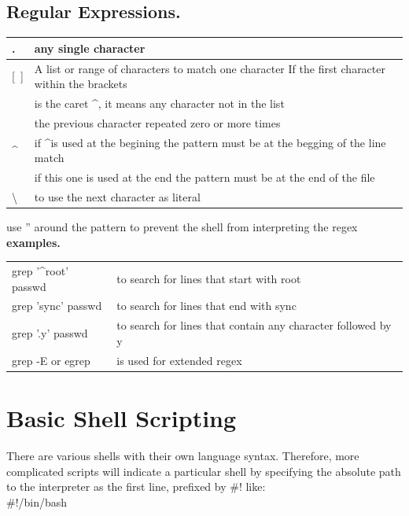 \documentclass[10pt]{article}
\begin{document}
\subsection{Regular Expressions.}
\begin{center}
	\begin{tabular}{|l|l|}
		\hline.    & any single character\\
		\hline{[\ ]}& A list or range of characters to match one character If the first character within the brackets \\
					&is the caret	\textasciicircum, it means any character not in the list\\
		\hline\textasteriskcentered &  the previous character repeated zero or more times\\
		\hline\textasciicircum & if \textasciicircum is used at the begining the pattern must be at the begging of the line match\\
		\hline\textdollar & if this one is used at the end the pattern must be at the end of the file\\
		\hline\textbackslash & to use the next character as literal\\\hline
	\end{tabular}
\end{center}
use '' around the pattern to prevent the shell from interpreting the regex\\
\textbf{examples.}\\
\begin{center}
	\begin{tabular}{l l}


		grep '\textasciicircum  root' passwd & to search for lines that start with root\\
		grep 'sync\textdollar ' passwd & to search for lines that end with sync\\
		grep '.y' passwd & to search for lines that contain any character followed by y\\
		grep -E or egrep & is used for extended regex\\

	\end{tabular}
\end{center}

\section{Basic Shell Scripting}
There are various shells with their own language syntax. Therefore, more complicated scripts will indicate a
particular shell by specifying the absolute path to the interpreter as the first line, prefixed by \#! like: \\
\#!/bin/bash\\
\end{document}
